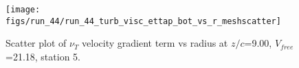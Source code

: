 \begin{figure}[H]
\centering
\texttt{[image: figs/run\_44/run\_44\_turb\_visc\_ettap\_bot\_vs\_r\_meshscatter]}
\caption{Scatter plot of $\nu_T$ velocity gradient term vs radius at $z/c$=9.00, $V_{free}$=21.18, station 5.}
\label{fig:run_44_turb_visc_ettap_bot_vs_r_meshscatter}
\end{figure}


